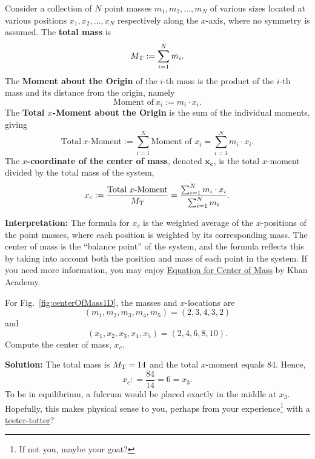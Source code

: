 Consider a collection of \( N \) point masses \( m_1, m_2, \ldots, m_N \) of various sizes located at various positions \( x_1, x_2, \ldots, x_N \) respectively along the $x$-axis, where no symmetry is assumed. The \textbf{total mass} is
\[ M_{\rm T} := \sum_{i=1}^{N} m_i. \]
The \textbf{Moment about the Origin} of the $i$-th mass is the product of the $i$-th mass and its distance from the origin, namely
\[ \text{Moment of}~x_i:=  m_i \cdot x_i. \]
The \textbf{Total $x$-Moment about the Origin} is the sum of the individual moments, giving
\[ \text{Total}~ x\text{-Moment} :=\sum_{i=1}^{N} \text{Moment of } x_i= \sum_{i=1}^{N} m_i \cdot x_i. \]
The \textbf{$x$-coordinate of the center of mass}, denoted $\bm{x_c}$, is the total $x$-moment divided by the total mass of the system, 
\[ x_c := \frac{\text{Total}~ x\text{-Moment}}{ M_{\rm T}} = \frac{\sum_{i=1}^{N} m_i \cdot x_i}{\sum_{i=1}^{N} m_i}. \]


\textbf{Interpretation:} The formula for \( x_c\) is the weighted average of the $x$-positions of the point masses, where each position is weighted by its corresponding mass. The center of mass is the ``balance point'' of the system, and the formula reflects this by taking into account both the position and mass of each point in the system. If you need more information, you may enjoy \href{https://www.khanacademy.org/science/physics/linear-momentum/center-of-mass/v/center-of-mass-equation}{Equation for Center of Mass} by Khan Academy.\\




\bigskip

\begin{example} For Fig.~\ref{fig:centerOfMass1D}, the masses and $x$-locations are 
$$(m_1, m_2, m_3, m_4, m_5) = (2, 3, 4, 3, 2)$$
and
$$(x_1, x_2, x_3, x_4, x_5) = (2, 4, 6, 8, 10).$$
Compute the center of mass, $x_c$.
    
\end{example}

\textbf{Solution:}
The total mass is ${M_{\rm T}} = 14$ and the total $x$-moment equals $84$. Hence, 
$$x_c: = \frac{84}{14} = 6 = x_3.$$
To be in equilibrium, a fulcrum would be placed exactly in the middle at $x_3$. Hopefully, this makes physical sense to you, perhaps from your experience\footnote{If not you, maybe your goat?} with a \href{https://youtu.be/jbhkjpa6rC8}{teeter-totter}? 

